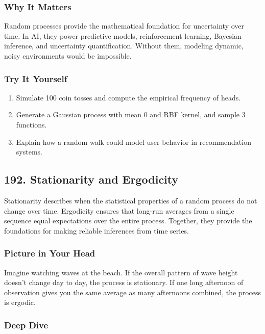 \documentclass[
  letterpaper,
  DIV=11,
  numbers=noendperiod]{scrreprt}
\providecommand{\tightlist}{%
  \setlength{\itemsep}{0pt}\setlength{\parskip}{0pt}}
\begin{document}
\subsubsection{Why It Matters}\label{why-it-matters-88}

Random processes provide the mathematical foundation for uncertainty
over time. In AI, they power predictive models, reinforcement learning,
Bayesian inference, and uncertainty quantification. Without them,
modeling dynamic, noisy environments would be impossible.

\subsubsection{Try It Yourself}\label{try-it-yourself-190}

\begin{enumerate}
\def\labelenumi{\arabic{enumi}.}
\tightlist
\item
  Simulate 100 coin tosses and compute the empirical frequency of heads.
\item
  Generate a Gaussian process with mean 0 and RBF kernel, and sample 3
  functions.
\item
  Explain how a random walk could model user behavior in recommendation
  systems.
\end{enumerate}

\subsection{192. Stationarity and
Ergodicity}\label{stationarity-and-ergodicity}

Stationarity describes when the statistical properties of a random
process do not change over time. Ergodicity ensures that long-run
averages from a single sequence equal expectations over the entire
process. Together, they provide the foundations for making reliable
inferences from time series.

\subsubsection{Picture in Your Head}\label{picture-in-your-head-191}

Imagine watching waves at the beach. If the overall pattern of wave
height doesn't change day to day, the process is stationary. If one long
afternoon of observation gives you the same average as many afternoons
combined, the process is ergodic.

\subsubsection{Deep Dive}\label{deep-dive-191}
\end{document}
